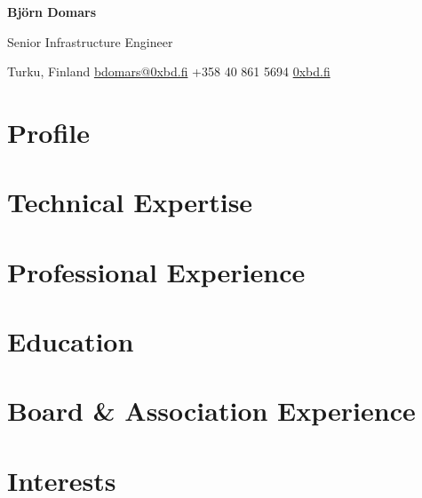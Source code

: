 \documentclass[10pt,a4paper]{article}
\begin{document}
{\Huge\bfseries Björn Domars}

\vspace{0.3em}

{\large\color{muted} Senior Infrastructure Engineer}

\vspace{0.6em}

Turku, Finland
\quad\textbullet\quad
\href{mailto:bdomars@0xbd.fi}{bdomars@0xbd.fi}
\quad\textbullet\quad
+358 40 861 5694
\quad\textbullet\quad
\href{https://0xbd.fi}{0xbd.fi}

\section{Profile}


\section{Technical Expertise}


\section{Professional Experience}


\section{Education}


\section{Board \& Association Experience}


\section{Interests}

\end{document}
